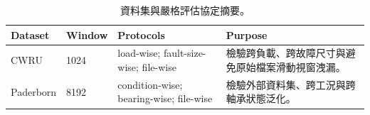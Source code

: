 \begin{table}[H]
\caption{資料集與嚴格評估協定摘要。}
\label{tab:dataset_protocols}
\centering
\small
\begin{tabularx}{\textwidth}{l l X X}
\toprule
Dataset & Window & Protocols & Purpose \\
\midrule
CWRU & 1024 & load-wise; fault-size-wise; file-wise & 檢驗跨負載、跨故障尺寸與避免原始檔案滑動視窗洩漏。 \\
Paderborn & 8192 & condition-wise; bearing-wise; file-wise & 檢驗外部資料集、跨工況與跨軸承狀態泛化。 \\
\bottomrule
\end{tabularx}
\end{table}
